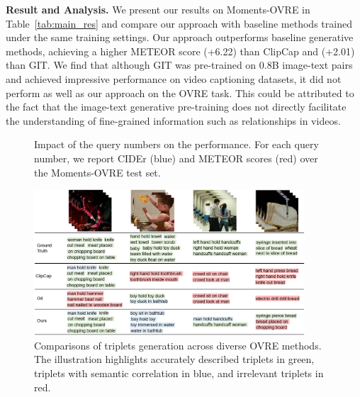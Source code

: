 \documentclass[letterpaper]{article}
\begin{document}
\noindent\textbf{Result and Analysis. }
We present our results on Moments-OVRE in Table~\ref{tab:main_res} and compare our approach with baseline methods trained under the same training settings.
Our approach outperforms baseline generative methods, achieving a higher METEOR score (+6.22) than ClipCap and (+2.01) than GIT.
We find that although GIT was pre-trained on 0.8B image-text pairs and achieved impressive performance on video captioning datasets, it did not perform as well as our approach on the OVRE task. This could be attributed to the fact that the image-text generative pre-training does not directly facilitate the understanding of fine-grained information such as relationships in videos.

\begin{figure}
  \centering
  \caption{Impact of the query numbers on the performance. For each query number, we report CIDEr (blue) and METEOR scores (red)  over the Moments-OVRE test set. }
   \label{fig:abl_qnumber}
\end{figure}


\begin{figure}[ht]
  \centering
  \includegraphics[width=0.9\textwidth]{fig/tab.png}
  \caption{Comparisons of triplets generation across diverse OVRE methods.
  The illustration highlights accurately described triplets in green, triplets with semantic correlation in blue, and irrelevant triplets in red.
  }
  \label{fig:visualize}
\end{figure}
\end{document}
